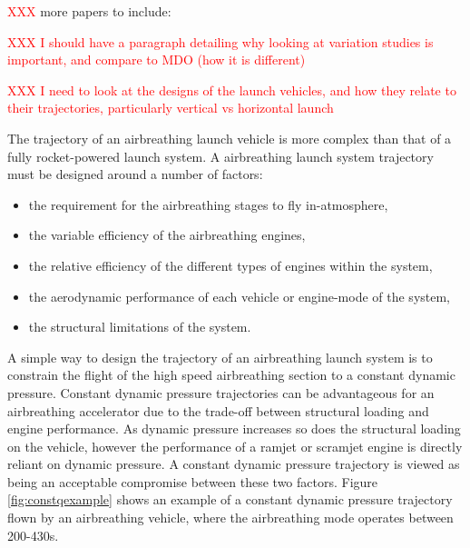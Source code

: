   \textcolor{red}{XXX} more papers to include:
  
  \textcolor{red}{XXX I should have a paragraph detailing why looking at variation studies is important, and compare to MDO (how it is different)}
  
  \textcolor{red}{XXX I need to look at the designs of the launch vehicles, and how they relate to their trajectories, particularly vertical vs horizontal launch}
  
  The trajectory of an airbreathing launch vehicle is more complex than that of a fully rocket-powered launch system. 
  A airbreathing launch system trajectory must be designed around a number of factors:
  \begin{itemize}
  	\item the requirement for the airbreathing stages to fly in-atmosphere,
  	\item the variable efficiency of the airbreathing engines,
  	\item the relative efficiency of the different types of engines within the system,
  	\item the aerodynamic performance of each vehicle or engine-mode of the system,
  	\item the structural limitations of the system.
  \end{itemize}
  
  A simple way to design the trajectory of an airbreathing launch system is to constrain the flight of the high speed airbreathing section to a constant dynamic pressure\cite{Olds1998,Preller2015,Punnoose2007,Kanda1996,Young2006}. 
  Constant dynamic pressure trajectories can be advantageous for an airbreathing accelerator due to the trade-off between structural loading and engine performance\cite{Olds1998}. As dynamic pressure increases so does the structural loading on the vehicle, however the performance of a ramjet or scramjet engine is directly reliant on dynamic pressure\cite{Olds1998}. A constant dynamic pressure trajectory is viewed as being an acceptable compromise between these two factors. Figure \ref{fig:constqexample} shows an example of a constant dynamic pressure trajectory flown by an airbreathing vehicle, where the airbreathing mode operates between 200-430s. 
  
